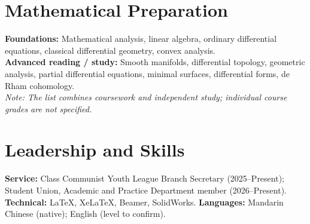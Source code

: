 \documentclass[10pt,a4paper]{article}
\begin{document}
\section*{Mathematical Preparation}
\textbf{Foundations:} Mathematical analysis, linear algebra, ordinary differential equations, classical differential geometry, convex analysis.\\
\textbf{Advanced reading / study:} Smooth manifolds, differential topology, geometric analysis, partial differential equations, minimal surfaces, differential forms, de Rham cohomology.\\
\emph{Note: The list combines coursework and independent study; individual course grades are not specified.}
\section*{Leadership and Skills}
\textbf{Service:} Class Communist Youth League Branch Secretary (2025--Present); Student Union, Academic and Practice Department member (2026--Present).\\
\textbf{Technical:} LaTeX, XeLaTeX, Beamer, SolidWorks. \quad \textbf{Languages:} Mandarin Chinese (native); English (level to confirm).
\end{document}
